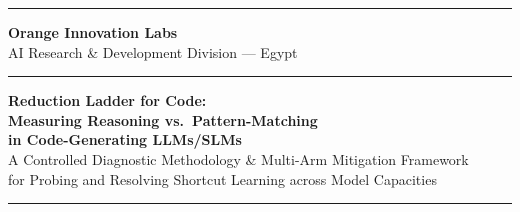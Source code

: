 \documentclass[12pt, a4paper]{article}
\begin{document}
\begin{titlepage}
  \pagecolor{DarkBG}
  \color{white}
  \begin{center}
    \vspace*{0.8cm}
    
    {\color{OrangeMain}\rule{\textwidth}{3pt}}
    \vspace{0.4cm}
    
    {\Large\bfseries\color{OrangeLight} Orange Innovation Labs}\\[0.2cm]
    {\normalsize\color{MidGray} AI Research \& Development Division --- Egypt}
    
    \vspace{0.6cm}
    {\color{OrangeMain}\rule{0.4\textwidth}{1pt}}
    \vspace{0.6cm}
    
    {\Huge\bfseries\color{white}
      Reduction Ladder for Code:\\[0.3cm]
      \color{OrangeMain} Measuring Reasoning vs.\ Pattern-Matching\\
      \color{white} in Code-Generating LLMs/SLMs}\\[0.4cm]
    
    {\large\color{LightGray}
      A Controlled Diagnostic Methodology \& Multi-Arm Mitigation Framework\\
      for Probing and Resolving Shortcut Learning across Model Capacities}
    
    \vspace{0.8cm}
    {\color{OrangeMain}\rule{0.4\textwidth}{1pt}}
    \vspace{0.8cm}
    

\end{center}
\end{titlepage}
\end{document}
